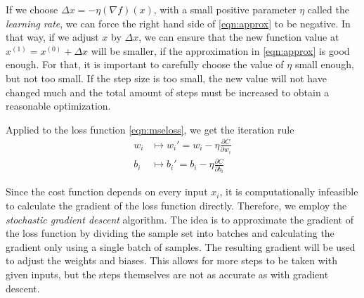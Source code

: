 If we choose $\Delta x = -\eta (\nabla f)(x)$, with a small positive parameter $\eta$ called the \textit{learning rate}, we can force the right hand side of \eqref{eqn:approx} to be negative. In that way, if we adjust $x$ by $\Delta x$, we can ensure that the new function value at $x^{(1)} = x^{(0)}+ \Delta x$ will be smaller, if the approximation in \eqref{eqn:approx} is good enough. For that, it is important to carefully choose the value of $\eta$ small enough, but not too small. If the step size is too small, the new value will not have changed much and the total amount of steps must be increased to obtain a reasonable optimization.

Applied to the loss function \eqref{eqn:mseloss}, we get the iteration rule
\begin{align}
  w_i & \mapsto w_i' = w_i - \eta \frac{\partial C}{\partial w_i} \\
  b_i & \mapsto b_i' = b_i - \eta \frac{\partial C}{\partial b_i}
\end{align}

Since the cost function depends on every input $x_i$, it is computationally infeasible to calculate the gradient of the loss function directly. Therefore, we employ the \textit{stochastic gradient descent} algorithm. The idea is to approximate the gradient of the loss function by dividing the sample set into batches and calculating the gradient only using a single batch of samples. The resulting gradient will be used to adjust the weights and biases. This allows for more steps to be taken with given inputs, but the steps themselves are not as accurate as with gradient descent.



